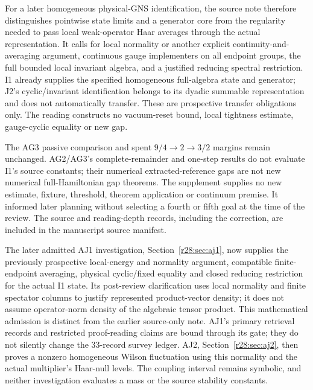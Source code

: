 For a later homogeneous physical-GNS identification, the source note therefore distinguishes pointwise state limits and a generator core from the regularity needed to pass local weak-operator Haar averages through the actual representation. It calls for local normality or another explicit continuity-and-averaging argument, continuous gauge implementers on all endpoint groups, the full bounded local invariant algebra, and a justified reducing spectral restriction. I1 already supplies the specified homogeneous full-algebra state and generator; J2's cyclic/invariant identification belongs to its dyadic summable representation and does not automatically transfer. These are prospective transfer obligations only. The reading constructs no vacuum-reset bound, local tightness estimate, gauge-cyclic equality or new gap.

The AG3 passive comparison and spent $9/4\to2\to3/2$ margins remain unchanged. AG2/AG3's complete-remainder and one-step results do not evaluate I1's source constants; their numerical extracted-reference gaps are not new numerical full-Hamiltonian gap theorems. The supplement supplies no new estimate, fixture, threshold, theorem application or continuum premise. It informed later planning without selecting a fourth or fifth goal at the time of the review. The source and reading-depth records, including the correction, are included in the manuscript source manifest.

The later admitted AJ1 investigation, Section~\ref{r28:sec:aj1}, now supplies the previously prospective local-energy and normality argument, compatible finite-endpoint averaging, physical cyclic/fixed equality and closed reducing restriction for the actual I1 state. Its post-review clarification uses local normality and finite spectator columns to justify represented product-vector density; it does not assume operator-norm density of the algebraic tensor product. This mathematical admission is distinct from the earlier source-only note. AJ1's primary retrieval records and restricted proof-reading claims are bound through its gate; they do not silently change the 33-record survey ledger. AJ2, Section~\ref{r28:sec:aj2}, then proves a nonzero homogeneous Wilson fluctuation using this normality and the actual multiplier's Haar-null levels. The coupling interval remains symbolic, and neither investigation evaluates a mass or the source stability constants.
